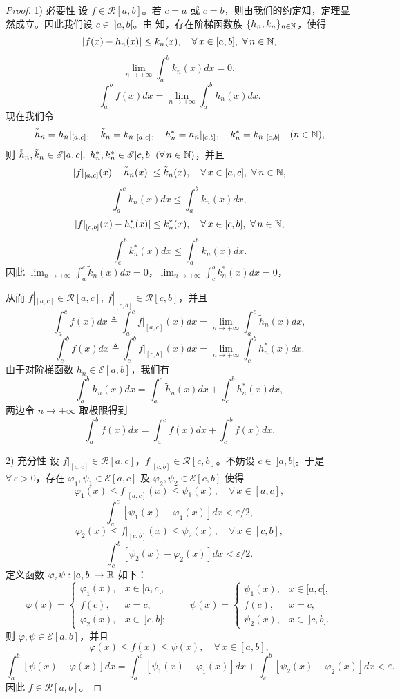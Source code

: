 \begin{proof}

	1) 必要性 设 \(f\in\mathscr{R}[a,b]\)。若 \(c=a\) 或 \(c=b\)，则由我们的约定知，定理显然成立。因此我们设 \(c\in\ ]a,b[\)。由 知，存在阶梯函数族 \(\{h_n,k_n\}_{n\in\mathbb{N}}\)，使得
	\[
	|f(x)-h_n(x)|\le k_n(x),\quad\forall\,x\in[a,b],\ \forall\,n\in\N,
	\]
	\[
	\lim_{n\to+\infty}\int_a^b k_n(x)dx=0,
	\]
	\[
	\int_a^b f(x)dx=\lim_{n\to+\infty}\int_a^b h_n(x)dx.
	\]
	现在我们令
	\[
	\tilde h_n=h_n|_{[a,c]},\quad \tilde k_n=k_n|_{[a,c]},\quad h_n^*=h_n|_{[c,b]},\quad k_n^*=k_n|_{[c,b]}\quad(n\in\mathbb{N}),
	\]
	则 \(\tilde h_n,\tilde k_n\in\mathscr{E}[a,c],\ h_n^*,k_n^*\in\mathscr{E}[c,b]\ (\forall\,n\in\N)\)，并且
	\[
	|f|_{[a,c]}(x)-\tilde h_n(x)|\le\tilde k_n(x),\quad\forall\,x\in[a,c],\ \forall\,n\in\mathbb{N},
	\]
	\[
	\int_a^c\tilde k_n(x)dx\le\int_a^b k_n(x)dx,
	\]
	\[
	|f|_{[c,b]}(x)-h_n^*(x)|\le k_n^*(x),\quad\forall\,x\in[c,b],\ \forall\,n\in\mathbb{N},
	\]
	\[
	\int_c^b k_n^*(x)dx\le\int_a^b k_n(x)dx.
	\]
	因此 \(\displaystyle\lim_{n\to+\infty}\int_a^c\tilde k_n(x)dx=0\)，\(\displaystyle\lim_{n\to+\infty}\int_c^b k_n^*(x)dx=0\)，

	从而 \(f|_{[a,c]}\in\mathscr{R}[a,c],\ f|_{[c,b]}\in\mathscr{R}[c,b]\)，并且
	\[
	\int_a^c f(x)dx\triangleq\int_a^c f|_{[a,c]}(x)dx=\lim_{n\to+\infty}\int_a^c\tilde h_n(x)dx,
	\]
	\[
	\int_c^b f(x)dx\triangleq\int_c^b f|_{[c,b]}(x)dx=\lim_{n\to+\infty}\int_c^b h_n^*(x)dx.
	\]
	由于对阶梯函数 \(h_n\in\mathscr{E}[a,b]\)，我们有
	\[
	\int_a^b h_n(x)dx=\int_a^c\tilde h_n(x)dx+\int_c^b h_n^*(x)dx,
	\]
	两边令 \(n\to+\infty\) 取极限得到
	\[
	\int_a^b f(x)dx=\int_a^c f(x)dx+\int_c^b f(x)dx.
	\]

	2) 充分性 设 \(f|_{[a,c]}\in\mathscr{R}[a,c]\)，\(f|_{[c,b]}\in\mathscr{R}[c,b]\)。不妨设 \(c\in\ ]a,b[\)。于是 \(\forall\,\varepsilon>0\)，存在 \(\varphi_1,\psi_1\in\mathscr{E}[a,c]\) 及 \(\varphi_2,\psi_2\in\mathscr{E}[c,b]\) 使得
	\[
	\varphi_1(x)\le f|_{[a,c]}(x)\le\psi_1(x),\quad\forall\,x\in[a,c],
	\]
	\[
	\int_a^c[\psi_1(x)-\varphi_1(x)]dx<\varepsilon/2,
	\]
	\[
	\varphi_2(x)\le f|_{[c,b]}(x)\le\psi_2(x),\quad\forall\,x\in[c,b],
	\]
	\[
	\int_c^b[\psi_2(x)-\varphi_2(x)]dx<\varepsilon/2.
	\]
	定义函数 \(\varphi,\psi:[a,b]\to\mathbb{R}\) 如下：
	\[
	\varphi(x)=\begin{cases} \varphi_1(x), & x\in[a,c[, \\ f(c), & x=c, \\ \varphi_2(x), & x\in\ ]c,b]; \end{cases}
	\qquad
	\psi(x)=\begin{cases} \psi_1(x), & x\in[a,c[, \\ f(c), & x=c, \\ \psi_2(x), & x\in\ ]c,b]. \end{cases}
	\]
	则 \(\varphi,\psi\in\mathscr{E}[a,b]\)，并且
	\[
	\varphi(x)\le f(x)\le\psi(x),\quad\forall\,x\in[a,b],
	\]
	\[
	\int_a^b[\psi(x)-\varphi(x)]dx=\int_a^c[\psi_1(x)-\varphi_1(x)]dx+\int_c^b[\psi_2(x)-\varphi_2(x)]dx<\varepsilon.
	\]
	因此 \(f\in\mathscr{R}[a,b]\)。

\end{proof}

